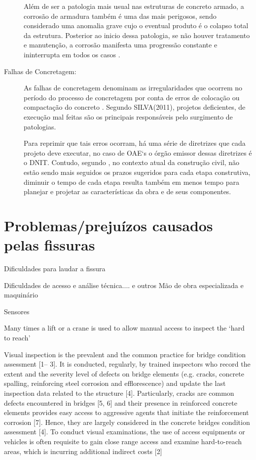 \begin{description}
    Além de ser a patologia mais usual nas estruturas de concreto armado, a corrosão de armadura também é uma das mais perigosos, sendo considerado uma anomalia grave cujo o eventual produto é o colapso total da estrutura\cite{tecnosil_2017}. 
    Posterior ao inicio dessa patologia, se não houver tratamento e manutenção, a corrosão manifesta uma progressão constante e ininterrupta em todos os casos \cite{tecnosil_2017}.
    
    \item[Falhas de Concretagem:]
    
    As falhas de concretagem denominam as irregularidades que ocorrem no período do processo de concretagem por conta de erros de colocação ou compactação do concreto \cite{statera}.
    Segundo SILVA(2011), projetos deficientes, de execução mal feitas são os principais responsáveis pelo surgimento de patologias.
    
    Para reprimir que tais erros ocorram, há uma série de diretrizes que cada projeto deve executar, no caso de OAE`s o órgão emissor dessas diretrizes é o DNIT. 
    Contudo, segundo , no contexto atual da construção civil, não estão sendo mais seguidos os prazos sugeridos para cada etapa construtiva, diminuir o tempo de cada etapa resulta também em menos tempo para planejar e projetar as características da obra e de seus componentes.

    
\end{description}


\section{Problemas/prejuízos causados pelas fissuras}

Dificuldades para laudar a fissura

Dificuldades de acesso e análise técnica.... e outros
Mão de obra especializada e maquinário

Sensores

Many times a lift or a crane is used to allow manual access to inspect the ‘hard to reach’

Visual inspection is the prevalent and the common practice for bridge condition assessment
[1– 3]. It is conducted, regularly, by trained inspectors who record the extent and the
severity level of defects on bridge elements (e.g. cracks, concrete spalling, reinforcing steel
corrosion and efflorescence) and update the last inspection data related to the structure [4].
Particularly, cracks are common defects encountered in bridges [5, 6] and their presence in
reinforced concrete elements provides easy access to aggressive agents that initiate the reinforcement corrosion [7]. Hence, they are largely considered in the concrete bridges
condition assessment [4].
To conduct visual examinations, the use of access equipments or vehicles is often
requisite to gain close range access and examine hard-to-reach areas, which is incurring
additional indirect costs [2]

